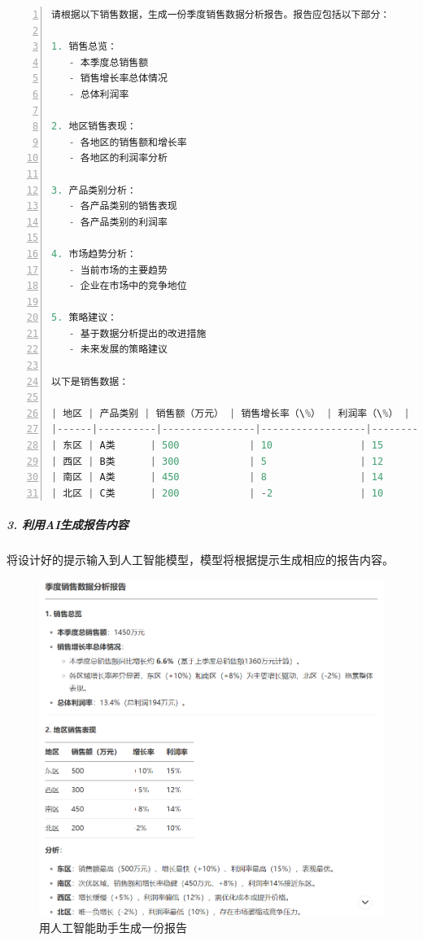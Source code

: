 \begin{lstlisting}[language={python},label={},caption={}, basicstyle=\footnotesize\ttfamily, breaklines=true, numbers=left, frame=single]
请根据以下销售数据，生成一份季度销售数据分析报告。报告应包括以下部分：

1. 销售总览：
   - 本季度总销售额
   - 销售增长率总体情况
   - 总体利润率

2. 地区销售表现：
   - 各地区的销售额和增长率
   - 各地区的利润率分析

3. 产品类别分析：
   - 各产品类别的销售表现
   - 各产品类别的利润率

4. 市场趋势分析：
   - 当前市场的主要趋势
   - 企业在市场中的竞争地位

5. 策略建议：
   - 基于数据分析提出的改进措施
   - 未来发展的策略建议

以下是销售数据：

| 地区 | 产品类别 | 销售额（万元） | 销售增长率（\%） | 利润率（\%） |
|------|----------|----------------|------------------|--------------|
| 东区 | A类      | 500            | 10               | 15           |
| 西区 | B类      | 300            | 5                | 12           |
| 南区 | A类      | 450            | 8                | 14           |
| 北区 | C类      | 200            | -2               | 10           |
\end{lstlisting}

\subparagraph{3. 利用AI生成报告内容}

将设计好的提示输入到人工智能模型，模型将根据提示生成相应的报告内容。

\begin{figure}[ht]
  \centering
  \includegraphics[width=\linewidth]{image/4/生成报告.png}
  \caption{用人工智能助手生成一份报告}
\end{figure}

